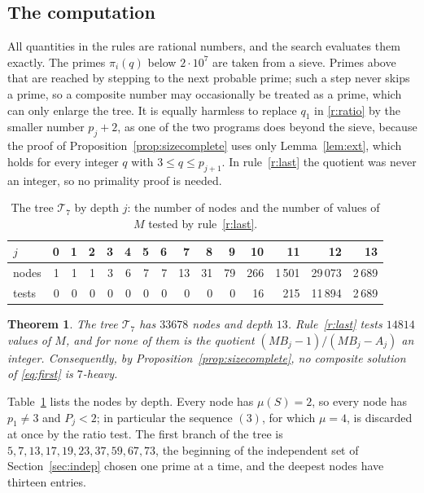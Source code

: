 \documentclass[11pt,reqno]{amsart}
\numberwithin{equation}{section}
\theoremstyle{plain}
\newtheorem{theorem}{Theorem}[section]
\theoremstyle{definition}
\theoremstyle{remark}
\begin{document}
\subsection{The computation}\label{sec:sizecomp}
All quantities in the rules are rational numbers, and the search
evaluates them exactly. The primes $\pi_i(q)$ below $2\cdot10^7$ are
taken from a sieve. Primes above that are reached by stepping to the
next probable prime; such a step never skips a prime, so a composite
number may occasionally be treated as a prime, which can only enlarge
the tree. It is equally harmless to replace $q_1$ in \ref{r:ratio} by
the smaller number $p_j+2$, as one of the two programs does beyond
the sieve, because the proof of
Proposition~\ref{prop:sizecomplete} uses only Lemma~\ref{lem:ext},
which holds for every integer $q$ with $3\le q\le p_{j+1}$. In
rule~\ref{r:last} the quotient was never an integer, so no primality
proof is needed.

\begin{table}[ht]
\centering
\caption{The tree $\mathcal T_7$ by depth $j$: the number of nodes and
the number of values of $M$ tested by rule~\ref{r:last}.}
\label{tab:heavy}
\smallskip
\small
\begin{tabular}{@{}l*{14}{r}@{}}
\toprule
$j$ & 0 & 1 & 2 & 3 & 4 & 5 & 6 & 7 & 8 & 9 & 10 & 11 & 12 & 13\\
\midrule
nodes & 1 & 1 & 1 & 3 & 6 & 7 & 7 & 13 & 31 & 79 & 266 & 1\,501 & 29\,073 & 2\,689\\
tests & 0 & 0 & 0 & 0 & 0 & 0 & 0 & 0 & 0 & 0 & 16 & 215 & 11\,894 & 2\,689\\
\bottomrule
\end{tabular}
\end{table}

\begin{theorem}\label{thm:sizesearch}
The tree $\mathcal T_7$ has $33678$ nodes and depth $13$.
Rule~\ref{r:last} tests $14814$ values of $M$, and for none of them is
the quotient $(MB_j-1)/(MB_j-A_j)$ an integer. Consequently, by
Proposition~\ref{prop:sizecomplete}, no composite solution of
\eqref{eq:first} is $7$-heavy.
\end{theorem}

Table~\ref{tab:heavy} lists the nodes by depth. Every node has
$\mu(S)=2$, so every node has $p_1\ne3$ and $P_j<2$; in particular
the sequence $(3)$, for which $\mu=4$, is discarded at once by the
ratio test. The first branch of the tree is
$5,7,13,17,19,23,37,59,67,73$, the beginning of the independent set
of Section~\ref{sec:indep} chosen one prime at a time, and the deepest
nodes have thirteen entries.
\end{document}
